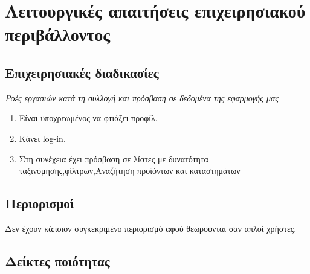 \section{Λειτουργικές απαιτήσεις επιχειρησιακού περιβάλλοντος}



\subsection{Επιχειρησιακές διαδικασίες}

\textit{Ροές εργασιών κατά τη συλλογή και πρόσβαση σε δεδομένα της εφαρμογής μας}

\begin{enumerate}
	\item Είναι υποχρεωμένος να φτιάξει προφίλ.
	\item Κάνει log-in.
	\item Στη συνέχεια έχει πρόσβαση σε λίστες με δυνατότητα ταξινόμησης,φίλτρων,Αναζήτηση προϊόντων και καταστημάτων
\end{enumerate}

\subsection{Περιορισμοί}
Δεν έχουν κάποιον συγκεκριμένο περιορισμό αφού θεωρούνται σαν απλοί χρήστες.

\subsection{Δείκτες ποιότητας}

